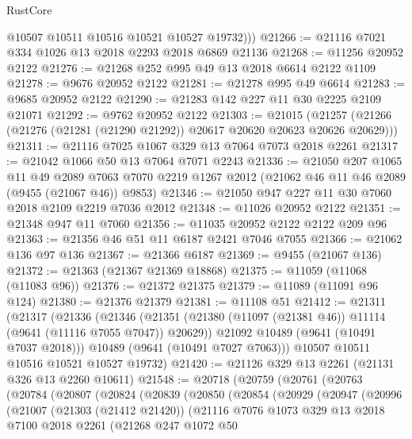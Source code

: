 \begin{lexlean}{RustCore}
\begin{coremodule}
          @10507
          @10511
          @10516
          @10521
          @10527
          @19732)))
@21266 := @21116 @7021 @334 @1026 @13 @2018 @2293 @2018 @6869 @21136
@21268 := @11256 @20952 @2122
@21276 := @21268 @252 @995 @49 @13 @2018 @6614 @2122 @1109
@21278 := @9676 @20952 @2122
@21281 := @21278 @995 @49 @6614
@21283 := @9685 @20952 @2122
@21290 := @21283 @142 @227 @11 @30 @2225 @2109 @21071
@21292 := @9762 @20952 @2122
@21303 := @21015
    (@21257 (@21266 (@21276 (@21281 (@21290 @21292)) @20617 @20620 @20623 @20626 @20629)))
@21311 := @21116 @7025 @1067 @329 @13 @7064 @7073 @2018 @2261
@21317 := @21042 @1066 @50 @13 @7064 @7071 @2243
@21336 := @21050
    @207
    @1065
    @11
    @49
    @2089
    @7063
    @7070
    @2219
    @1267
    @2012
    (@21062 @46 @11 @46 @2089 (@9455 (@21067 @46)) @9853)
@21346 := @21050 @947 @227 @11 @30 @7060 @2018 @2109 @2219 @7036 @2012
@21348 := @11026 @20952 @2122
@21351 := @21348 @947 @11 @7060
@21356 := @11035 @20952 @2122 @2122 @209 @96
@21363 := @21356 @46 @51 @11 @6187 @2421 @7046 @7055
@21366 := @21062 @136 @97 @136
@21367 := @21366 @6187
@21369 := @9455 (@21067 @136)
@21372 := @21363 (@21367 @21369 @18868)
@21375 := @11059 (@11068 (@11083 @96))
@21376 := @21372 @21375
@21379 := @11089 (@11091 @96 @124)
@21380 := @21376 @21379
@21381 := @11108 @51
@21412 := @21311
    (@21317
      (@21336
        (@21346
          (@21351 (@21380 (@11097 (@21381 @46)) @11114 (@9641 (@11116 @7055 @7047)) @20629))
          @21092
          @10489
          (@9641 (@10491 @7037 @2018)))
        @10489
        (@9641 (@10491 @7027 @7063)))
      @10507
      @10511
      @10516
      @10521
      @10527
      @19732)
@21420 := @21126 @329 @13 @2261 (@21131 @326 @13 @2260 @10611)
@21548 := @20718
    (@20759
      (@20761
        (@20763
          (@20784
            (@20807
              (@20824
                (@20839
                  (@20850
                    (@20854
                      (@20929
                        (@20947
                          (@20996
                            (@21007
                              (@21303 (@21412 @21420))
                              (@21116
                                @7076
                                @1073
                                @329
                                @13
                                @2018
                                @7100
                                @2018
                                @2261
                                (@21268
                                  @247
                                  @1072
                                  @50

\end{coremodule}
\end{lexlean}
